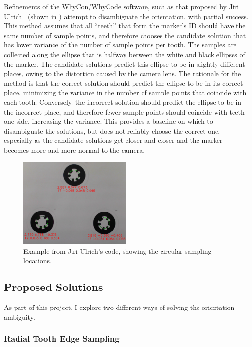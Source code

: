 Refinements of the WhyCon/WhyCode software, such as that proposed by Jiri Ulrich~\cite{julrich_whycon} (shown in ) attempt to disambiguate
the orientation, with partial success.
This method assumes that all ``teeth'' that form the marker's ID should have the same number of sample points,
and therefore chooses the candidate solution that has lower variance of the number of sample points per tooth.
The samples are collected along the ellipse that is halfway between the white and black ellipses of the marker.
The candidate solutions predict this ellipse to be in slightly different places,
owing to the distortion caused by the camera lens.
The rationale for the method is that the correct solution should predict the ellipse to be in its correct place,
minimizing the variance in the number of sample points that coincide with each tooth.
Conversely, the incorrect solution should predict the ellipse to be in the incorrect place,
and therefore fewer sample points should coincide with teeth one side, increasing the variance.
This provides a baseline on which to disambiguate the solutions, but does not reliably choose the correct one,
especially as the candidate solutions get closer and closer and the marker becomes more and more normal to the camera.

\begin{figure}
    \centering
    \includegraphics[width=0.5\textwidth]{images/cropped_whycode_3_8_jiri_example}
    \caption{Example from Jiri Ulrich's code, showing the circular sampling locations.}
    \label{figure:jiri_whycode}
\end{figure}

\subsection{Proposed Solutions}

As part of this project, I explore two different ways of solving the orientation ambiguity.

\subsubsection{Radial Tooth Edge Sampling}

